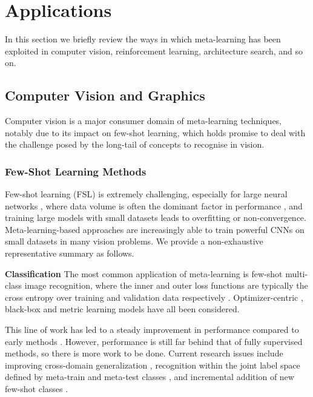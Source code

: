 \documentclass[10pt,journal,compsoc]{IEEEtran}
\newcommand{\cut}[1]{}
\newcommand{\keypoint}[1]{\vspace{0.1cm}\noindent\textbf{#1}\quad}
\begin{document}
\section{Applications}

In this section we briefly review the ways in which meta-learning has been exploited in computer vision, reinforcement learning, architecture search, and so on. 
\subsection{Computer Vision and Graphics}
Computer vision is a major consumer domain of meta-learning techniques, notably due to its impact on few-shot learning, which holds promise to deal with the challenge posed by the long-tail of concepts to recognise in vision.

\subsubsection{Few-Shot Learning Methods}\label{sec:fsl}
Few-shot learning (FSL) is extremely challenging, especially for large neural networks \cite{krizhevsky2012imagenetdeepcnn,he2016resnet}, where data volume is often the dominant factor in performance \cite{sun2017unreasonable}, and training large models with small datasets leads to overfitting or  non-convergence. Meta-learning-based approaches are increasingly able to train powerful CNNs on small datasets in many vision problems. We provide a non-exhaustive representative summary as follows.


\keypoint{Classification} The most common application of meta-learning is few-shot multi-class image recognition, where the inner and outer loss functions are typically the cross entropy over training and validation data respectively \cite{vinyals2016matching, snell2017prototypicalnets, ravi2016optimization, li2017meta, antoniou2018maml, garcia2018fewshot, yin2019meta, rusu2019leo, yoon2019tapnet, antoniou2019learning, yao2019hierarchically, rae2019meta, raghu2019rapid, yao2020automated, flennerhag2020warpgrad}. Optimizer-centric \cite{finn2017maml}, black-box \cite{mishra2017simple,qiao2017parametersfromactivations} and metric learning \cite{vinyals2016matching,sung2018relationnet,garcia2018fewshot} models have all been considered. \cut{Relevant benchmarks are covered in Section~\ref{sec:ClassificationBenchmarks}.}

This line of work has led to a steady improvement in performance compared to early methods \cite{vinyals2016matching,finn2017maml,kosh2015siameseoneshot}. However, performance is still far behind that of fully supervised methods, so there is more work to be done. Current research issues include improving cross-domain generalization \cite{tseng2020crossdomain}, recognition within the joint label space defined by meta-train and meta-test classes \cite{gidaris2018dynamicfewshot}, and incremental addition of new few-shot classes \cite{ren2019incremental,perezrua2020once}.
\end{document}

